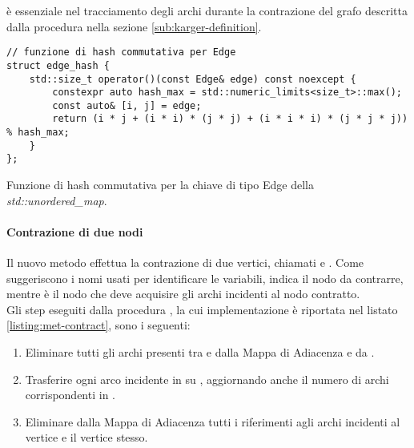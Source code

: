 \noindent {} è essenziale nel tracciamento degli archi durante la contrazione del grafo descritta dalla procedura   nella sezione \ref{sub:karger-definition}.\\

\begin{listing}[!ht]
\begin{verbatim}
// funzione di hash commutativa per Edge
struct edge_hash {
    std::size_t operator()(const Edge& edge) const noexcept {
        constexpr auto hash_max = std::numeric_limits<size_t>::max();
        const auto& [i, j] = edge;
        return (i * j + (i * i) * (j * j) + (i * i * i) * (j * j * j)) % hash_max;
    }
};
\end{verbatim}
\caption{Funzione di hash commutativa per la chiave di tipo Edge della \textit{std::unordered\_map}.}
\label{listing:hash-fun}
\end{listing}

\paragraph{Contrazione di due nodi}
\label{par:contraction}

Il nuovo metodo  effettua la contrazione di due vertici, chiamati  e . Come suggeriscono i nomi usati per identificare le variabili,  indica il nodo da contrarre, mentre  è il nodo che deve acquisire gli archi incidenti al nodo contratto. \\

\noindent Gli step eseguiti dalla procedura , la cui implementazione è riportata nel listato \ref{listing:met-contract}, sono i seguenti:

\begin{enumerate}
    \item Eliminare tutti gli archi presenti tra
       e  dalla Mappa di Adiacenza e da .

    \item Trasferire ogni arco incidente in
       su , aggiornando anche il numero di archi corrispondenti in .

    \item Eliminare dalla Mappa di Adiacenza tutti i riferimenti agli archi incidenti al vertice  e il vertice stesso.
\end{enumerate}

